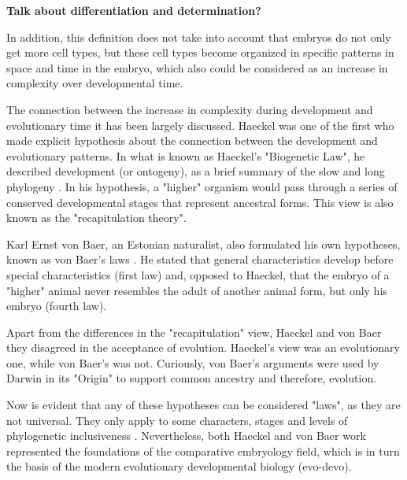 \textbf{Talk about differentiation and determination?}

 
In addition, this definition does not take into account that embryos do not only get more cell types, but these cell types become organized in specific patterns in space and time in the embryo, which also could be considered as an increase in complexity over developmental time.

\begin{mdframed}[style=boxstyle,frametitle={Box1. On the similarity of complexity patterns between Evolution and Development}]\label{Box1:Haeckel&vonBaer}

The connection between the increase in complexity during development and evolutionary time it has been largely discussed.
Haeckel was one of the first who made explicit hypothesis about the connection between the development and evolutionary patterns.
In what is known as Haeckel's "Biogenetic Law", he described development (or ontogeny), as a brief summary of the slow and long phylogeny \citep{haeckel1874menschen}.
In his hypothesis, a "higher" organism would pass through a series of conserved developmental stages that represent ancestral forms. This view is also known as the "recapitulation theory".

Karl Ernst von Baer, an Estonian naturalist, also formulated his own hypotheses, known as von Baer's laws \citep{vonBaer1828uber}. He stated that general characteristics develop before special characteristics (first law) and, opposed to Haeckel, that the embryo of a "higher" animal never resembles the adult of another animal form, but only his embryo (fourth law). 

Apart from the differences in the "recapitulation" view, Haeckel and von Baer \citep{Richardson2002} they disagreed in the acceptance of evolution. 
Haeckel's view was an evolutionary one, while von Baer's was not. Curiously, von Baer's arguments were used by Darwin in its "Origin" \citep{darwin1859origin} to support common ancestry and therefore, evolution.

Now is evident that any of these hypotheses can be considered "laws", as they are not universal. They only apply to some characters, stages and levels of phylogenetic inclusiveness \citep{Richardson2002}. Nevertheless, both Haeckel and von Baer work represented the foundations of the comparative embryology field, which is in turn the basis of the modern evolutionary developmental biology (evo-devo).
\end{mdframed}

